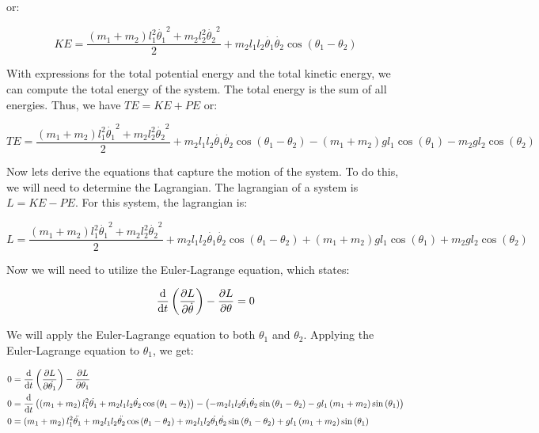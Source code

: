 or:

\begin{equation}
    KE = \frac{\left(m_1 + m_2\right)l_1^2\dot{\theta_1}^2+m_2l_2^2\dot{\theta_2}^2}{2} + m_2l_1l_2\dot{\theta_1}\dot{\theta_2}\cos\left(\theta_1 - \theta_2\right)
    \label{eq:kinetic-energy}
\end{equation}

With expressions for the total potential energy and the total kinetic energy, we can compute the total energy of the system. The total energy is the sum of all energies. Thus, we have $TE=KE+PE$ or:

\begin{equation}
    TE = \frac{\left(m_1 + m_2\right)l_1^2\dot{\theta_1}^2+m_2l_2^2\dot{\theta_2}^2}{2} + m_2l_1l_2\dot{\theta_1}\dot{\theta_2}\cos\left(\theta_1 - \theta_2\right) - \left(m_1 + m_2\right)gl_1\cos\left(\theta_1\right) - m_2gl_2\cos\left(\theta_2\right)
    \label{eq:total-energy}
\end{equation}

Now lets derive the equations that capture the motion of the system. To do this, we will need to determine the Lagrangian. The lagrangian of a system is $L=KE-PE$. For this system, the lagrangian is:

\begin{equation}
    L = \frac{\left(m_1 + m_2\right)l_1^2\dot{\theta_1}^2+m_2l_2^2\dot{\theta_2}^2}{2} + m_2l_1l_2\dot{\theta_1}\dot{\theta_2}\cos\left(\theta_1 - \theta_2\right) + \left(m_1 + m_2\right)gl_1\cos\left(\theta_1\right) + m_2gl_2\cos\left(\theta_2\right)
    \label{eq:lagrangian}
\end{equation}

Now we will need to utilize the Euler-Lagrange equation, which states:

\begin{equation}
    \diff[]{}{t}\left(\pdiff[]{L}{\dot{\theta}}\right) - \pdiff[]{L}{\theta} = 0
    \label{eq:euler-lagrange}
\end{equation}

We will apply the Euler-Lagrange equation to both $\theta_1$ and $\theta_2$. Applying the Euler-Lagrange equation to $\theta_1$, we get:

\begin{align*}
    0 &= \diff[]{}{t}\left(\pdiff[]{L}{\dot{\theta_1}}\right) - \pdiff[]{L}{\theta_1}\\
    0 &= \diff[]{}{t}\left(\left(m_1 + m_2\right)l_1^2\dot{\theta_1} + m_2l_1l_2\dot{\theta_2}\cos\left(\theta_1 - \theta_2\right)\right) - \left(-m_2l_1l_2\dot{\theta_1}\dot{\theta_2}\sin\left(\theta_1 - \theta_2\right) - gl_1\left(m_1 + m_2\right)\sin\left(\theta_1\right)\right)\\
    0 &= \left(m_1 + m_2\right)l_1^2\ddot{\theta_1} + m_2l_1l_2\ddot{\theta_2}\cos\left(\theta_1 - \theta_2\right) + m_2l_1l_2\dot{\theta_1}\dot{\theta_2}\sin\left(\theta_1 - \theta_2\right) + gl_1\left(m_1 + m_2\right)\sin\left(\theta_1\right)
\end{align*}

